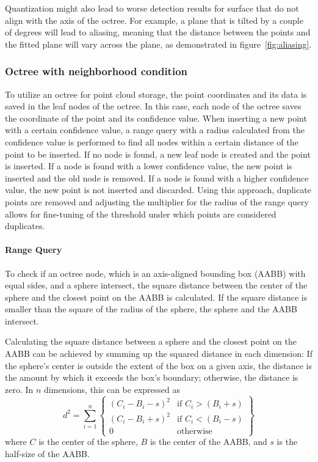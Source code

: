 Quantization might also lead to worse detection results for surface that do not align with the axis of the octree.
For example, a plane that is tilted by a couple of degrees will lead to aliasing,
meaning that the distance between the points and the fitted plane will vary across the plane, as demonstrated in figure~\ref{fig:aliasing}.

\subsubsection{Octree with neighborhood condition}
To utilize an octree for point cloud storage, the point coordinates and its data is saved in the leaf nodes of the octree.
In this case, each node of the octree saves the coordinate of the point and its confidence value.
When inserting a new point with a certain confidence value, a range query with a radius calculated from the confidence value
is performed to find all nodes within a certain distance of the point to be inserted.
If no node is found, a new leaf node is created and the point is inserted.
If a node is found with a lower confidence value, the new point is inserted and the old node is removed.
If a node is found with a higher confidence value, the new point is not inserted and discarded.
Using this approach, duplicate points are removed and adjusting the multiplier for the radius of the range query
allows for fine-tuning of the threshold under which points are considered duplicates.

\paragraph{Range Query}
To check if an octree node, which is an axis-aligned bounding box (AABB) with equal sides, and a sphere intersect,
the square distance between the center of the sphere and the closest point on the AABB is calculated.
If the square distance is smaller than the square of the radius of the sphere, the sphere and the AABB intersect.

Calculating the square distance between a sphere and the closest point on the AABB can be achieved by summing up the
squared distance in each dimension:
If the sphere's center is outside the extent of the box on a given axis,
the distance is the amount by which it exceeds the box's boundary; otherwise, the distance is zero.
In $n$ dimensions, this can be expressed as
\begin{equation}
    d^2 = \sum_{i=1}^{n} \left\{
    \begin{array}{ll}
    (C_i - B_i - s)
        ^2                & \text{if } C_i > (B_i + s) \\
        (C_i - B_i + s)^2 & \text{if } C_i < (B_i - s) \\
        0                 & \text{otherwise}
    \end{array}
    \right\}
\end{equation}
where $C$ is the center of the sphere, $B$ is the center of the AABB, and $s$ is the half-size of the AABB\@.
\parencite{glassner_graphics_1994}

